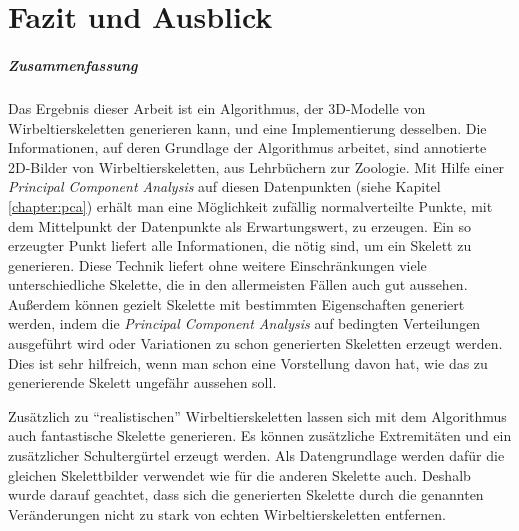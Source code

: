 \chapter{Fazit und Ausblick}
\label{chapter:conclusion}

% 
% 

\paragraph{Zusammenfassung}

Das Ergebnis dieser Arbeit ist ein Algorithmus, der 3D-Modelle von Wirbeltierskeletten generieren kann, und eine Implementierung desselben. Die Informationen, auf deren Grundlage der Algorithmus arbeitet, sind annotierte 2D-Bilder von Wirbeltierskeletten, \zb aus Lehrbüchern zur Zoologie. Mit Hilfe einer \emph{Principal Component Analysis} auf diesen Datenpunkten (siehe Kapitel \ref{chapter:pca}) erhält man eine Möglichkeit zufällig normalverteilte Punkte, mit dem Mittelpunkt der Datenpunkte %
als Erwartungswert, zu erzeugen. Ein so erzeugter Punkt liefert alle Informationen, die nötig sind, um ein Skelett zu generieren.
Diese Technik liefert ohne weitere Einschränkungen viele unterschiedliche Skelette, die in den allermeisten Fällen auch gut aussehen.\\
Außerdem können gezielt Skelette mit bestimmten Eigenschaften generiert werden, indem die \emph{Principal Component Analysis} auf bedingten Verteilungen ausgeführt wird oder Variationen zu schon generierten Skeletten erzeugt werden. Dies ist sehr hilfreich, wenn man schon eine Vorstellung davon hat, wie das zu generierende Skelett ungefähr aussehen soll.

Zusätzlich zu "`realistischen"' Wirbeltierskeletten lassen sich mit dem Algorithmus auch fantastische Skelette generieren. Es können zusätzliche Extremitäten und ein zusätzlicher Schultergürtel erzeugt werden. Als Datengrundlage werden dafür die gleichen Skelettbilder verwendet wie für die anderen Skelette auch. Deshalb wurde darauf geachtet, dass sich die generierten Skelette durch die genannten Veränderungen nicht zu stark von echten Wirbeltierskeletten entfernen.  

